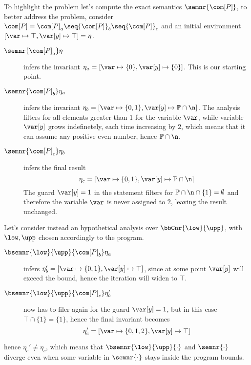 To highlight the problem let's compute the exact semantics
\(\semnr{\com[P]}\), to better address the problem, consider
\(\com[P] = {\com[P]}_a\seq {\com[P]}_b \seq {\com[P]}_c\) and an
initial environment \([\var\mapsto\top,\var[y]\mapsto\top] = \eta\).
\begin{description}
\item[\(\semnr{{\com[P]}_a}\eta\)] infers the invariant
  \(\eta_a = [\var\mapsto \{0\}, \var[y]\mapsto\{0\}]\). This is our
  starting point.
\item[\(\semnr{{\com[P]}_b}\eta_a\)] infers the invariant
  \(\eta_b = [\var\mapsto\{0,1\},
  \var[y]\mapsto\mathbb{P}\cap\n]\). The analysis filters for all
  elements greater than \(1\) for the variable \(\var\), while
  variable \(\var[y]\) grows indefinetely, each time increasing by
  \(2\), which means that it can assume any positive even number,
  hence \(\mathbb{P} \cap \n\).
\item[\(\semnr{{\com[P]}_c}\eta_b\)] infers the final result
  \begin{equation*}
    \eta_c = [\var\mapsto\{0,1\}, \var[y]\mapsto\mathbb{P}\cap\n]
  \end{equation*}
  The guard \(\var[y] = 1\) in the  statement filters for
  \(\mathbb{P}\cap\n\cap\{1\} = \emptyset\) and therefore the variable
  \(\var\) is never assigned to 2, leaving the result unchanged.
\end{description}

Let's consider instead an hypothetical analysis over
\(\bbCnr{\low}{\upp}\), with \(\low,\upp\) chosen accordingly to the
program.
\begin{description}
\item[\(\bsemnr{\low}{\upp}{{\com[P]}_b}\eta_a\)] infers
  \(\eta_b' = [\var\mapsto\{0,1\}, \var[y]\mapsto\top]\), since at
  some point \(\var[y]\) will exceed the bound, hence the iteration
  will widen to \(\top\).
  
\item[\(\bsemnr{\low}{\upp}{{\com[P]}_c}\eta_b'\)] now has to filer
  again for the guard \(\var[y] = 1\), but in this case
  \(\top \cap \{1\} = \{1\}\), hence the final invariant becomes
  \begin{equation*}
    \eta_c' = [\var\mapsto\{0,1,2\}, \var[y] \mapsto \top]
  \end{equation*}
\end{description}
hence \(\eta_c'\neq\eta_c\), which means that
\(\bsemnr{\low}{\upp}{\cdot}\) and \(\semnr{\cdot}\) diverge even when
some variable in \(\semnr{\cdot}\) stays inside the program bounds.

